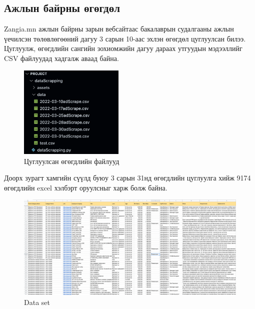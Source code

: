 \subsection{Ажлын байрны өгөгдөл}
Zangia.mn ажлын байрны зарын вебсайтаас бакалаврын судалгааны ажлын үечилсэн төлөвлөгөөний дагуу 3 сарын 10-аас эхлэн өгөгдөл цуглуулсан билээ. Цуглуулж, өгөгдлийн сангийн зохиомжийн дагуу дараах утгуудын мэдээллийг CSV файлуудад хадгалж аваад байна. 
\begin{figure}[ht]
  \centering
  \includegraphics[width=5cm]{images/allData.png}
  \caption{Цуглуулсан өгөгдлийн файлууд}\label{fig:dataSet}
\end{figure}
Доорх зурагт хамгийн сүүлд буюу 3 сарын 31нд өгөгдлийн цуглуулга хийж 9174 өгөгдлийн excel хэлбэрт оруулсныг харж болж байна. 
\begin{figure}[ht]
  \centering
  \includegraphics[width=\textwidth]{images/dataSet.png}
  \caption{Data set}\label{fig:dataSet1}
\end{figure}
